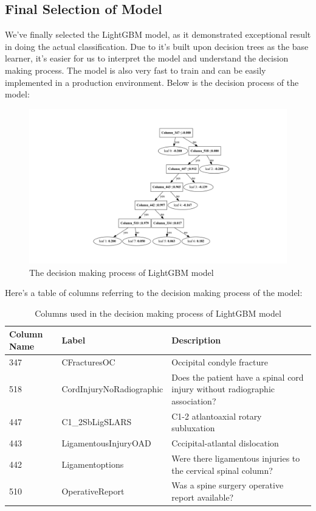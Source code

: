 \documentclass[10pt,letterpaper]{article}
\begin{document}
\subsection{Final Selection of Model}
We've finally selected the LightGBM model, as it demonstrated exceptional result in doing the actual classification. Due to it's built upon decision trees as the base learner, it's easier for us to interpret the model and understand the decision making process. The model is also very fast to train and can be easily implemented in a production environment. Below is the decision process of the model:

\begin{figure}[H]
    \centering
    \includegraphics[width=\linewidth]{plots/lgbm_tree_vert.pdf}
    \caption{The decision making process of LightGBM model}
    \label{fig:confusion-matrix-transformer}
\end{figure}

Here's a table of columns referring to the decision making process of the model:

\begin{table}[H]
    \centering
    \footnotesize
    \begin{tabular}{lll}
    \toprule
    \textbf{Column Name} & \textbf{Label} & \textbf{Description} \\
    \midrule
    347 & CFracturesOC & Occipital condyle fracture \\
    518 & CordInjuryNoRadiographic & Does the patient have a spinal cord injury without radiographic association?\\
    447 & C1\_2SbLigSLARS & C1-2 atlantoaxial rotary subluxation\\
    443 & LigamentousInjuryOAD & Cccipital-atlantal dislocation \\
    442 & Ligamentoptions & Were there ligamentous injuries to the cervical spinal column? \\ 
    510 & OperativeReport & Was a spine surgery operative report available? \\ 
    \bottomrule
    \end{tabular}
    \caption{Columns used in the decision making process of LightGBM model}%
\end{table}
\end{document}
